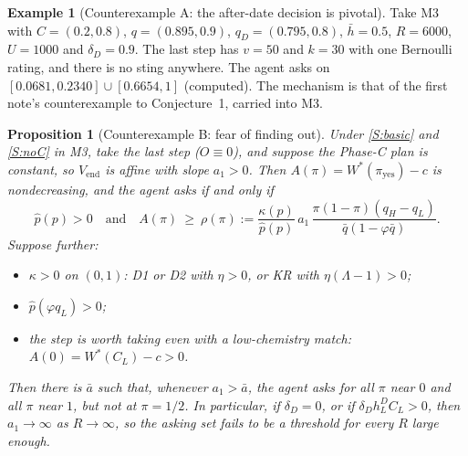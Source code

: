 \documentclass[11pt,a4paper]{article}
\newtheorem{proposition}[theorem]{Proposition}
\theoremstyle{definition}
\newtheorem{example}[theorem]{Example}
\theoremstyle{remark}
\newcommand{\Vend}{V_{\mathrm{end}}}
\newcommand{\pp}{\hat p}
\newcommand{\py}{\pi_{\mathrm{yes}}}
\newcommand{\qb}{\bar q}
\begin{document}
\begin{example}[Counterexample A: the after-date decision is pivotal]\label{prop:c1A}
Take M3 with $C=(0.2,0.8)$, $q=(0.895,0.9)$, $q_D=(0.795,0.8)$, $\bar h=0.5$, $R=6000$, $U=1000$ and $\delta_D=0.9$. The last step has $v=50$ and $k=30$ with one Bernoulli rating, and there is no sting anywhere. The agent asks on $[0.0681,0.2340]\cup[0.6654,1]$ (computed). The mechanism is that of the first note's counterexample to Conjecture~1, carried into M3.
\end{example}

\begin{proposition}[Counterexample B: fear of finding out]\label{prop:c1B}
Under \ref{S:basic} and \ref{S:noC} in M3, take the last step ($O\equiv0$), and suppose the Phase-C plan is constant, so $\Vend$ is affine with slope $a_1>0$. Then $A(\pi)=W^*(\py)-c$ is nondecreasing, and the agent asks if and only if
\begin{equation}\label{eq:rho}
\pp(p)>0\quad\text{and}\quad A(\pi)\ \ge\ \rho(\pi):=\frac{\kappa(p)}{\pp(p)}\,a_1\,\frac{\pi(1-\pi)(q_H-q_L)}{\qb(1-\varphi\qb)} .
\end{equation}
Suppose further:
\begin{itemize}[nosep]
\item $\kappa>0$ on $(0,1)$: D1 or D2 with $\eta>0$, or KR with $\eta(\Lambda-1)>0$;
\item $\pp(\varphi q_L)>0$;
\item the step is worth taking even with a low-chemistry match: $A(0)=W^*(C_L)-c>0$.
\end{itemize}
Then there is $\bar a$ such that, whenever $a_1>\bar a$, the agent asks for all $\pi$ near $0$ and all $\pi$ near $1$, but not at $\pi=1/2$. In particular, if $\delta_D=0$, or if $\delta_Dh^D_LC_L>0$, then $a_1\to\infty$ as $R\to\infty$, so the asking set fails to be a threshold for every $R$ large enough.
\end{proposition}
\end{document}
